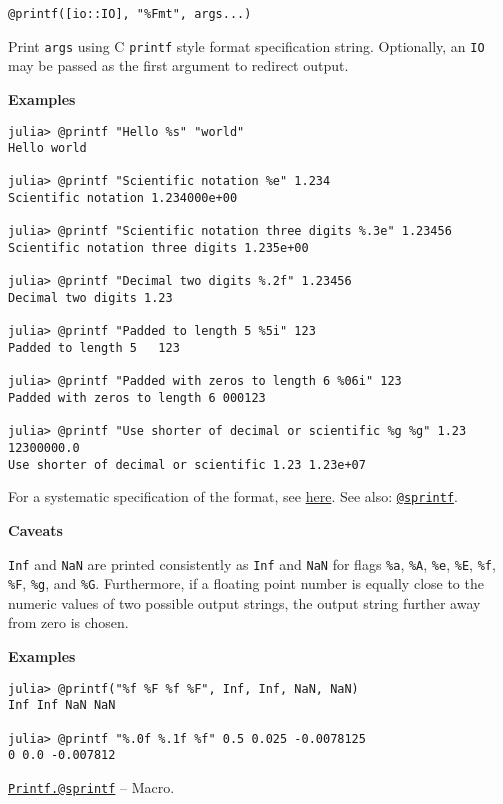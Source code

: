 \begin{adjustwidth}{2em}{0pt}


\begin{verbatim}
@printf([io::IO], "%Fmt", args...)
\end{verbatim}

Print \texttt{args} using C \texttt{printf} style format specification string. Optionally, an \texttt{IO} may be passed as the first argument to redirect output.

\textbf{Examples}


\begin{verbatim}
julia> @printf "Hello %s" "world"
Hello world

julia> @printf "Scientific notation %e" 1.234
Scientific notation 1.234000e+00

julia> @printf "Scientific notation three digits %.3e" 1.23456
Scientific notation three digits 1.235e+00

julia> @printf "Decimal two digits %.2f" 1.23456
Decimal two digits 1.23

julia> @printf "Padded to length 5 %5i" 123
Padded to length 5   123

julia> @printf "Padded with zeros to length 6 %06i" 123
Padded with zeros to length 6 000123

julia> @printf "Use shorter of decimal or scientific %g %g" 1.23 12300000.0
Use shorter of decimal or scientific 1.23 1.23e+07
\end{verbatim}

For a systematic specification of the format, see \href{https://www.cplusplus.com/reference/cstdio/printf/}{here}. See also: \hyperlink{13977800180580695709}{\texttt{@sprintf}}.

\textbf{Caveats}

\texttt{Inf} and \texttt{NaN} are printed consistently as \texttt{Inf} and \texttt{NaN} for flags \texttt{\%a}, \texttt{\%A}, \texttt{\%e}, \texttt{\%E}, \texttt{\%f}, \texttt{\%F}, \texttt{\%g}, and \texttt{\%G}. Furthermore, if a floating point number is equally close to the numeric values of two possible output strings, the output string further away from zero is chosen.

\textbf{Examples}


\begin{verbatim}
julia> @printf("%f %F %f %F", Inf, Inf, NaN, NaN)
Inf Inf NaN NaN

julia> @printf "%.0f %.1f %f" 0.5 0.025 -0.0078125
0 0.0 -0.007812
\end{verbatim}



\end{adjustwidth}
\hypertarget{13977800180580695709}{}
\hyperlink{13977800180580695709}{\texttt{Printf.@sprintf}}  -- {Macro.}

